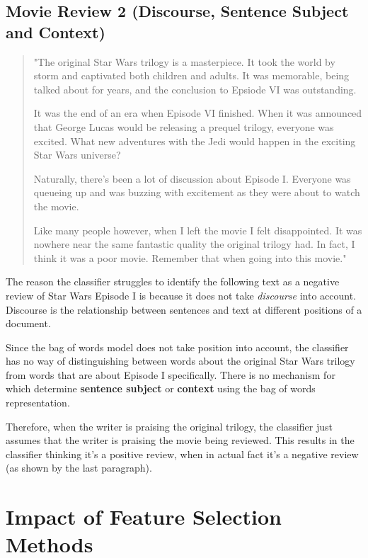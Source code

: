 \documentclass{article}
\begin{document}
\subsection{Movie Review 2 (Discourse, Sentence Subject and Context)}

\begin{quote}
"The original Star Wars trilogy is a masterpiece. It took the world by storm and captivated both children and adults. It was memorable, being talked about for years, and the conclusion to Epsiode VI was outstanding.

It was the end of an era when Episode VI finished. When it was announced that George Lucas would be releasing a prequel trilogy, everyone was excited. What new adventures with the Jedi would happen in the exciting Star Wars universe?

Naturally, there's been a lot of discussion about Episode I. Everyone was queueing up and was buzzing with excitement as they were about to watch the movie.

Like many people however, when I left the movie I felt disappointed. It was nowhere near the same fantastic quality the original trilogy had. In fact, I think it was a poor movie. Remember that when going into this movie."
\end{quote}

The reason the classifier struggles to identify the following text as a negative review of Star Wars Episode I is because it does not take \textit{discourse} into account. Discourse is the relationship between sentences and text at different positions of a document.

Since the bag of words model does not take position into account, the classifier has no way of distinguishing between words about the original Star Wars trilogy from words that are about Episode I specifically. There is no mechanism for which determine \textbf{sentence subject} or \textbf{context} using the bag of words representation.

Therefore, when the writer is praising the original trilogy, the classifier just assumes that the writer is praising the movie being reviewed. This results in the classifier thinking it's a positive review, when in actual fact it's a negative review (as shown by the last paragraph).

\section{Impact of Feature Selection Methods}
\end{document}
